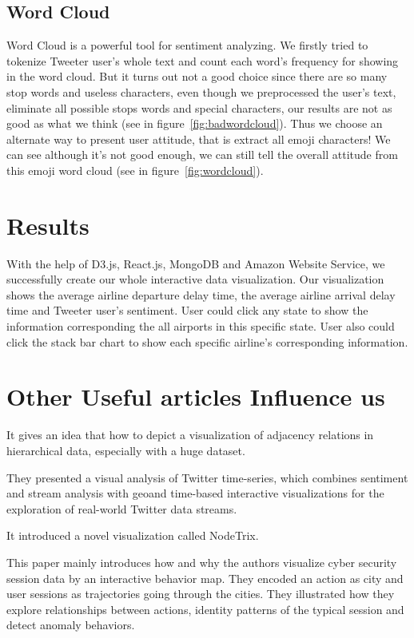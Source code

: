 \subsection{Word Cloud}
\wordcloud
Word Cloud is a powerful tool for sentiment analyzing\cite{heimerl2014word}. We firstly tried to tokenize Tweeter user's whole text and count each word's frequency for showing in the word cloud. But it turns out not a good choice since there are so many stop words and useless characters, even though we preprocessed the user's text, eliminate all possible stops words and special characters\cite{miner2012practical}, our results are not as good as what we think (see in figure~\ref{fig:badwordcloud}). Thus we choose an alternate way to present user attitude, that is extract all emoji characters! We can see although it's not good enough, we can still tell the overall attitude from this emoji word cloud (see in figure~\ref{fig:wordcloud}).
\badwordcloud
\section{Results}
With the help of D3.js, React.js, MongoDB and Amazon Website Service, we successfully create our whole interactive data visualization. Our visualization shows the average airline departure delay time, the average airline arrival delay time and Tweeter user's sentiment. User could click any state to show the information corresponding the all airports in this specific state. User also could click the stack bar chart to show each specific airline's corresponding information. 

\section{Other Useful articles Influence us}
It gives an idea that how to depict a visualization of adjacency relations in hierarchical data, especially with a huge dataset. \cite{holten2006hierarchical}

They presented a visual analysis of Twitter time-series, which combines sentiment and stream analysis with geoand time-based interactive visualizations for the exploration of real-world Twitter data streams. \cite{hao2011visual}

It introduced a novel visualization called NodeTrix.\cite{henry2007nodetrix} 

This paper mainly introduces how and why the authors visualize cyber security session data by an interactive behavior map. They encoded an action as city and user sessions as trajectories going through the cities. They illustrated how they explore relationships between actions, identity patterns of the typical session and detect anomaly behaviors.\cite{de2003visual}

